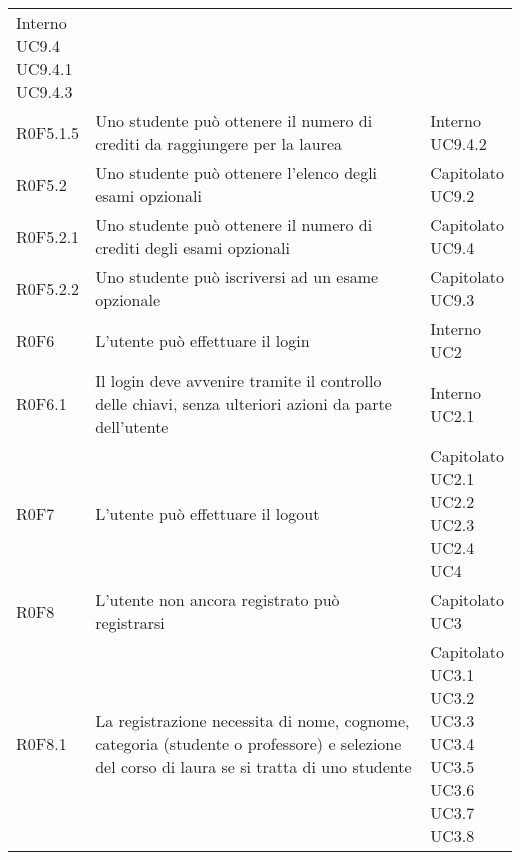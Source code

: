 \documentclass[AnalisiDeiRequisiti.tex]{subfiles}
\begin{document}
\begin{longtable}[H]{p{2cm}p{5.2cm}p{5cm}}
{		Interno \\ 
		UC9.4 \\
		UC9.4.1 \\
		UC9.4.3
	} \\
	R0F5.1.5 & Uno studente può ottenere il numero di crediti da raggiungere per la laurea & \makecell[tl]{
		Interno \\
		UC9.4.2
	} \\
	R0F5.2 & Uno studente può ottenere l'elenco degli esami opzionali & \makecell[tl]{
		Capitolato \\ 
		UC9.2
	} \\
	R0F5.2.1 & Uno studente può ottenere il numero di crediti degli esami opzionali & \makecell[tl]{
		Capitolato \\ 
		UC9.4
	} \\
	R0F5.2.2 & Uno studente può iscriversi ad un esame opzionale & \makecell[tl]{
		Capitolato \\ 
		UC9.3
	} \\
	R0F6 & L'utente può effettuare il login & \makecell[tl]{
		Interno \\ 
		UC2
	} \\
	R0F6.1 & Il login deve avvenire tramite il controllo delle chiavi, senza ulteriori azioni da parte dell'utente & \makecell[tl]{
		Interno \\ 
		UC2.1
	} \\
	R0F7 & L'utente può effettuare il logout & \makecell[tl]{
		Capitolato \\ 
		UC2.1  \\
		UC2.2 \\
		UC2.3 \\
		UC2.4 \\ 
		UC4
	} \\
	R0F8 & L'utente non ancora registrato può registrarsi & \makecell[tl]{
		Capitolato \\ 
		UC3
	} \\
	R0F8.1 & La registrazione necessita di nome, cognome, categoria (studente o professore) e selezione del corso di laura se si tratta di uno studente & \makecell[tl]{
		Capitolato \\
		UC3.1 \\
		UC3.2 \\
		UC3.3 \\
		UC3.4 \\
		UC3.5 \\
		UC3.6 \\
		UC3.7 \\
		UC3.8
	} \\

\end{longtable}
\end{document}
